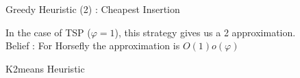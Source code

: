 \documentclass{beamer}
\begin{document}
\begin{frame}{Greedy Heuristic (2) : Cheapest Insertion }
\begin{figure}[H]
    
     \end{figure}
  \begin{center}

     {\color{byzantine}In the case of TSP ($\varphi=1$), this strategy gives us a 2 approximation. \\

              Belief : For Horsefly the approximation is $ O(1) o(\varphi)$} \normalsize
  \end{center}
\end{frame}

\begin{frame}{K2means Heuristic}
   \begin{figure}[H]
    \centering
  \end{figure}

\end{frame}
\end{document}
